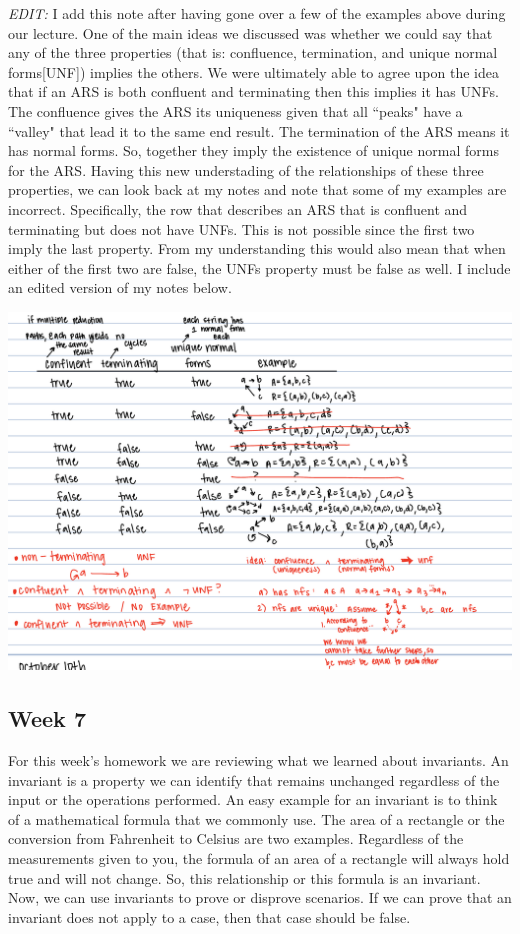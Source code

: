 \documentclass{article}
\theoremstyle{theorem}
\theoremstyle{definition}
\theoremstyle{remark}
\begin{document}
\textit{EDIT:} I add this note after having gone over a few of the examples above during our lecture. One of the main ideas we discussed was whether we could say that any of the three properties (that is: confluence, termination, and unique normal forms[UNF]) 
implies the others. We were ultimately able to agree upon the idea that if an ARS is both confluent and terminating then this implies it has UNFs. The confluence gives the ARS its uniqueness given that all ``peaks" have a ``valley" that lead it to the same 
end result. The termination of the ARS means it has normal forms. So, together they imply the existence of unique normal forms for the ARS. Having this new understading of the relationships of these three properties, we can look back at my notes and 
note that some of my examples are incorrect. Specifically, the row that describes an ARS that is confluent and terminating but does not have UNFs. This is not possible since the first two imply the last property. From my understanding
this would also mean that when either of the first two are false, the UNFs property must be false as well. I include an edited version of my notes below.

\includegraphics[width=15cm]{arsTableEdit.png}


\subsection{Week 7}

\indent For this week's homework we are reviewing what we learned about invariants. An invariant is a property we can identify that remains unchanged regardless of the input or the operations performed. An easy example for an invariant is to think of a mathematical 
formula that we commonly use. The area of a rectangle or the conversion from Fahrenheit to Celsius are two examples. Regardless of the measurements given to you, the formula of an area of a rectangle will always hold true and will not change. So, this relationship
or this formula is an invariant. Now, we can use invariants to prove or disprove scenarios. If we can prove that an invariant does not apply to a case, then that case should be false. \\
\end{document}
